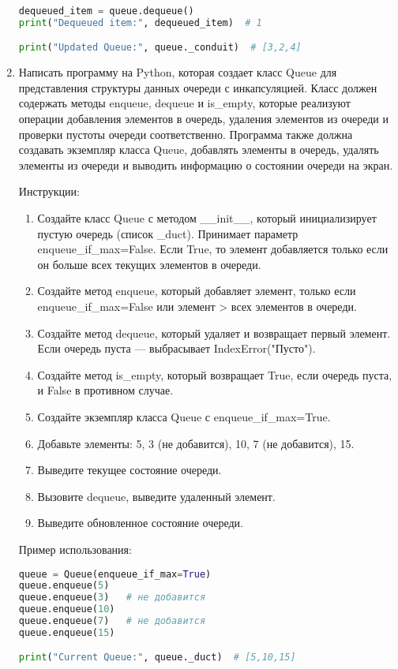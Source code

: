 \begin{enumerate}
\begin{lstlisting}[language=Python]
dequeued_item = queue.dequeue()
print("Dequeued item:", dequeued_item)  # 1

print("Updated Queue:", queue._conduit)  # [3,2,4]
\end{lstlisting}

\item Написать программу на Python, которая создает класс Queue для представления структуры данных очереди с инкапсуляцией. Класс должен содержать методы enqueue, dequeue и is\_empty, которые реализуют операции добавления элементов в очередь, удаления элементов из очереди и проверки пустоты очереди соответственно. Программа также должна создавать экземпляр класса Queue, добавлять элементы в очередь, удалять элементы из очереди и выводить информацию о состоянии очереди на экран.

Инструкции:
\begin{enumerate}
    \item Создайте класс Queue с методом \_\_init\_\_, который инициализирует пустую очередь (список \_duct). Принимает параметр enqueue\_if\_max=False. Если True, то элемент добавляется только если он больше всех текущих элементов в очереди.
    \item Создайте метод enqueue, который добавляет элемент, только если enqueue\_if\_max=False или элемент > всех элементов в очереди.
    \item Создайте метод dequeue, который удаляет и возвращает первый элемент. Если очередь пуста — выбрасывает IndexError("Пусто").
    \item Создайте метод is\_empty, который возвращает True, если очередь пуста, и False в противном случае.
    \item Создайте экземпляр класса Queue с enqueue\_if\_max=True.
    \item Добавьте элементы: 5, 3 (не добавится), 10, 7 (не добавится), 15.
    \item Выведите текущее состояние очереди.
    \item Вызовите dequeue, выведите удаленный элемент.
    \item Выведите обновленное состояние очереди.
\end{enumerate}

Пример использования:
\begin{lstlisting}[language=Python]
queue = Queue(enqueue_if_max=True)
queue.enqueue(5)
queue.enqueue(3)   # не добавится
queue.enqueue(10)
queue.enqueue(7)   # не добавится
queue.enqueue(15)

print("Current Queue:", queue._duct)  # [5,10,15]


\end{lstlisting}
\end{enumerate}
